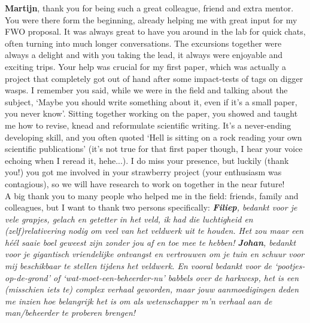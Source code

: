 \documentclass[10pt, twoside]{book} %
\begin{document}
\begin{small}
\textbf{Martijn}, thank you for being such a great colleague, friend and extra mentor. You were there form the beginning, already helping me with great input for my FWO proposal. It was always great to have you around in the lab for quick chats, often turning into much longer conversations. The excursions together were always a delight and with you taking the lead, it always were enjoyable and exciting trips. Your help was crucial for my first paper, which was actually a project that completely got out of hand after some impact-tests of tags on digger wasps. I remember you said, while we were in the field and talking about the subject, `Maybe you should write something about it, even if it's a small paper, you never know'. Sitting together working on the paper, you showed and taught me how to revise, knead and reformulate scientific writing. It's a never-ending developing skill, and you often quoted `Hell is sitting on a rock reading your own scientific publications' (it's not true for that first paper though, I hear your voice echoing when I reread it, hehe...). I do miss your presence, but luckily (thank you!) you got me involved in your strawberry project (your enthusiasm was contagious), so we will have research to work on together in the near future!\\

A big thank you to many people who helped me in the field: friends, family and colleagues, but I want to thank two persons specifically: \textit{\textbf{Filiep}, bedankt voor je vele grapjes, gelach en getetter in het veld, ik had die luchtigheid en (zelf)relativering nodig om veel van het veldwerk uit te houden. Het zou maar een héél saaie boel geweest zijn zonder jou af en toe mee te hebben! \textbf{Johan}, bedankt voor je gigantisch vriendelijke ontvangst en vertrouwen om je tuin en schuur voor mij beschikbaar te stellen tijdens het veldwerk. En vooral bedankt voor de `pootjes-op-de-grond' of `wat-moet-een-beheerder-nu' babbels over de harkwesp, het is een (misschien iets te) complex verhaal geworden, maar jouw aanmoedigingen deden me inzien hoe belangrijk het is om als wetenschapper m'n verhaal aan de man/beheerder te proberen brengen!}\\


\end{small}
\end{document}

